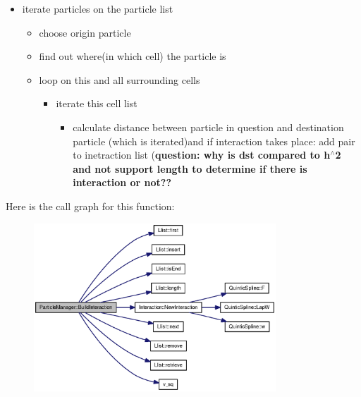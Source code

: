 \begin{itemize}
\item iterate particles on the particle list

\begin{itemize}
\item choose origin particle

\item find out where(in which cell) the particle is

\item loop on this and all surrounding cells

\begin{itemize}
\item iterate this cell list

\begin{itemize}
\item calculate distance between particle in question and destination particle (which is iterated)and if interaction takes place: add pair to inetraction list ({\bf question: why is dst compared to h$^\wedge$2 and not support length to determine if there is interaction or not??} \end{itemize}
\end{itemize}
\end{itemize}
\end{itemize}


Here is the call graph for this function:\nopagebreak
\begin{figure}[H]
\begin{center}
\leavevmode
\includegraphics[width=257pt]{classParticleManager_8cc6658324694ad28d3c50bfc0cbd0f7_cgraph}
\end{center}
\end{figure}


